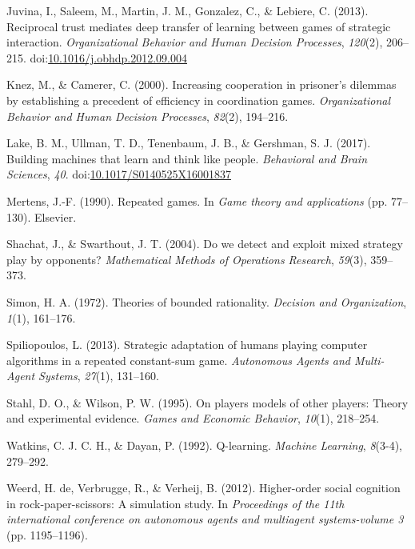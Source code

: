 \documentclass[man,floatsintext]{apa6}
\begin{document}
\leavevmode\hypertarget{ref-Juvina2013}{}%
Juvina, I., Saleem, M., Martin, J. M., Gonzalez, C., \& Lebiere, C. (2013). Reciprocal trust mediates deep transfer of learning between games of strategic interaction. \emph{Organizational Behavior and Human Decision Processes}, \emph{120}(2), 206--215. doi:\href{https://doi.org/10.1016/j.obhdp.2012.09.004}{10.1016/j.obhdp.2012.09.004}

\leavevmode\hypertarget{ref-knez2000increasing}{}%
Knez, M., \& Camerer, C. (2000). Increasing cooperation in prisoner's dilemmas by establishing a precedent of efficiency in coordination games. \emph{Organizational Behavior and Human Decision Processes}, \emph{82}(2), 194--216.

\leavevmode\hypertarget{ref-Lake2017}{}%
Lake, B. M., Ullman, T. D., Tenenbaum, J. B., \& Gershman, S. J. (2017). Building machines that learn and think like people. \emph{Behavioral and Brain Sciences}, \emph{40}. doi:\href{https://doi.org/10.1017/S0140525X16001837}{10.1017/S0140525X16001837}

\leavevmode\hypertarget{ref-mertens1990repeated}{}%
Mertens, J.-F. (1990). Repeated games. In \emph{Game theory and applications} (pp. 77--130). Elsevier.

\leavevmode\hypertarget{ref-shachat2004we}{}%
Shachat, J., \& Swarthout, J. T. (2004). Do we detect and exploit mixed strategy play by opponents? \emph{Mathematical Methods of Operations Research}, \emph{59}(3), 359--373.

\leavevmode\hypertarget{ref-simon1972theories}{}%
Simon, H. A. (1972). Theories of bounded rationality. \emph{Decision and Organization}, \emph{1}(1), 161--176.

\leavevmode\hypertarget{ref-spiliopoulos2013strategic}{}%
Spiliopoulos, L. (2013). Strategic adaptation of humans playing computer algorithms in a repeated constant-sum game. \emph{Autonomous Agents and Multi-Agent Systems}, \emph{27}(1), 131--160.

\leavevmode\hypertarget{ref-stahl1995players}{}%
Stahl, D. O., \& Wilson, P. W. (1995). On players models of other players: Theory and experimental evidence. \emph{Games and Economic Behavior}, \emph{10}(1), 218--254.

\leavevmode\hypertarget{ref-watkins1992q}{}%
Watkins, C. J. C. H., \& Dayan, P. (1992). Q-learning. \emph{Machine Learning}, \emph{8}(3-4), 279--292.

\leavevmode\hypertarget{ref-de2012higher}{}%
Weerd, H. de, Verbrugge, R., \& Verheij, B. (2012). Higher-order social cognition in rock-paper-scissors: A simulation study. In \emph{Proceedings of the 11th international conference on autonomous agents and multiagent systems-volume 3} (pp. 1195--1196).
\end{document}
